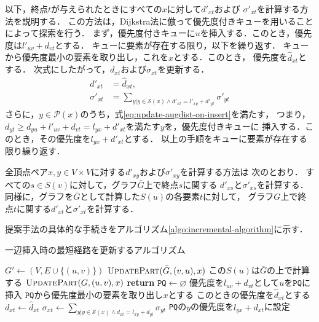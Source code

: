 以下，終点$t$が与えられたときにすべての$x$に対して$d'_{xt}$および
$\sigma'_{xt}$を計算する方法を説明する．
この方法は，Dijkstra法に倣って優先度付きキューを用いることによって探索を行う．
まず，優先度付きキューに$u$を挿入する．このとき，優先度は$l'_{uv}+d_{vt}$とする．
キューに要素が存在する限り，以下を繰り返す．
キューから優先度最小の要素を取り出し，これを$x$とする．このとき，
優先度を$\hat{d}_{xt}$とする．
次式にしたがって，$d_{xt}$および$\sigma_{xt}$を更新する．
\begin{equation*}
  \begin{aligned}
    d'_{xt}&=\hat{d}_{xt},\\
    \sigma'_{xt}&=\sum_{y|y\in\mathcal{S}(x)\land d'_{xt}=l'_{xy}+d'_{yt}}\sigma'_{yt}
  \end{aligned}
\end{equation*}
さらに，$y\in\mathcal{P}(x)$のうち，式\eqref{eq:update-augdist-on-insert}を満たす，
つまり，$d_{yt}\geq d_{yu}+l'_{uv}+d_{vt}=l_{yx}+d'_{xt}$を満たす$y$を，優先度付きキューに
挿入する．このとき，その優先度を$l_{yx}+d'_{xt}$とする．
以上の手順をキューに要素が存在する限り繰り返す．

全頂点ペア$x,y\in V\times V$に対する$d'_{xy}$および$\sigma'_{xy}$を計算する方法は
次のとおり．
すべての$s\in S(v)$に対して，グラフ$\bar{G}$上で終点$s$に関する
$d'_{xs}$と$\sigma'_{xs}$を計算する．
同様に，グラフを$\bar{G}$として計算した$S(u)$の各要素$t$に対して，
グラフ$G$上で終点$t$に関する$d'_{xt}$と$\sigma'_{xt}$を計算する．

提案手法の具体的な手続きをアルゴリズム\ref{algo:incremental-algorithm}に示す．

\begin{algorithm}[tbp]
  \caption{一辺挿入時の最短経路を更新するアルゴリズム}
  \label{algo:incremental-algorithm}
  \begin{multicols}{2}
    \begin{algorithmic}[1]\small
      \State $G'\gets (V,E\cup\{(u,v)\})$
      \State $\textproc{UpdatePart}(\bar{G},(v,u),x)$
      \EndFor
      \State\LeftComment この$S(u)$は$\bar{G}$の上で計算する
      \State $\textproc{UpdatePart}(G,(u,v),x)$
      \EndFor
      \EndProcedure
      \vfill\null
      \columnbreak
      \State \textbf{return}
      \EndIf
      \State $\texttt{PQ}\gets\varnothing$
      \State 優先度を$l_{uv}+d_{vt}$として$u$を$\texttt{PQ}$に挿入
      \State $\texttt{PQ}$から優先度最小の要素を取り出し$x$とする
      \State このときの優先度を$\hat{d}_{xt}$とする
      \State $d_{xt}\gets\hat{d}_{xt}$
      \State $\sigma_{xt}\gets\sum_{y|y\in\mathcal{S}(x)\land d_{xt}=l_{xy}+d_{yt}}\sigma_{yt}$
      \State \texttt{PQ}の$y$の優先度を$l_{yx}+d_{xt}$に設定
      \EndIf
      \EndFor
      \EndWhile
      \EndProcedure
    \end{algorithmic}
  \end{multicols}
\end{algorithm}

